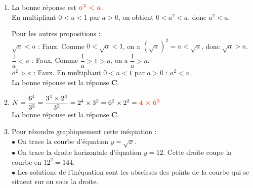 \documentclass[a4paper,11pt]{article}
\newcounter{seancenum}
\newcounter{seancenumD}
\begin{document}
\setcounter{seancenumD}{31}
\newpage
\begin{seanceD}{} %

\begin{enumerate}
\item La bonne réponse est ${\color[HTML]{F15929}\boldsymbol{a^2 < a}}$.\\
En multipliant $0 < a < 1$ par $a > 0$, on obtient $0 < a^2 < a$, donc $a^2 < a$.

\medskip

Pour les autres propositions :\\
$\sqrt{a} < a$ : Faux. Comme $0 < \sqrt{a} < 1$, on a $(\sqrt{a})^2 = a < \sqrt{a}$, donc $\sqrt{a} > a$.\\
$\dfrac{1}{a} < a$ : Faux. Comme $\dfrac{1}{a} > 1 > a$, on a $\dfrac{1}{a} > a$.\\
$a^2 > a$ : Faux. En multipliant $0 < a < 1$ par $a > 0$ : $a^2 < a$.\\La bonne réponse est la réponse {\bfseries \color[HTML]{F15929}C}.

\item $N=\dfrac{6^4}{3^2}=\dfrac{3^4\times 2^4 }{3^2}=2^4\times 3^{2}=6^2\times 2^{2}={\color[HTML]{F15929}\boldsymbol{4\times 6^{2}}}$\\La bonne réponse est la réponse {\bfseries \color[HTML]{F15929}C}.

\item \begin{minipage}[c]{0.6\textwidth}Pour résoudre graphiquement cette inéquation : \\
            $\bullet$ On trace la courbe d'équation $y=\sqrt{x}$. \\
            $\bullet$ On trace la droite horizontale d'équation $y=12$. Cette droite coupe la courbe en $12^2=144$. \\
            $\bullet$ Les solutions de l'inéquation sont les abscisses des points de la courbe qui se situent sur ou sous la droite.
            \end{minipage} \hfill \begin{minipage}[c]{0.4\textwidth}
            \begin{tikzpicture}[baseline,scale=0.7]


\end{tikzpicture}
\end{minipage}
\end{enumerate}
\end{seanceD}
\end{document}

